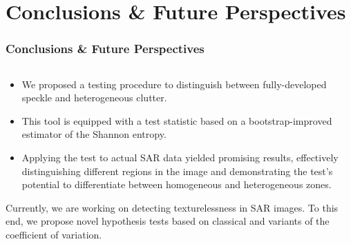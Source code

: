 \documentclass[aspectratio=169,10pt]{beamer}
\begin{document}

\section{Conclusions \& Future Perspectives}
\begin{frame} 
    \frametitle{\large{Conclusions \& Future Perspectives}}
    \vspace{-0.5cm}

    \justifying
    \begin{columns}[T,onlytextwidth]
        \begin{column}{.99\textwidth}
            \begin{exampleblock}{}\justifying
			
                \begin{itemize}
                    \item We proposed a testing procedure to distinguish between fully-developed speckle and heterogeneous clutter.
                    \item This tool is equipped with a test statistic based on a bootstrap-improved estimator of the Shannon entropy.
                    \item Applying the test to actual SAR data yielded promising results, effectively distinguishing different regions in the image and demonstrating the test's potential to differentiate between homogeneous and heterogeneous zones.
                \end{itemize}
                
                Currently, we are working on detecting texturelessness in SAR images. To this end, we propose novel hypothesis tests based on classical and variants of the coefficient of variation.
            \end{exampleblock}
        \end{column}
    \end{columns}
    
    \vspace{0.2cm}
\end{frame}



\end{document}
